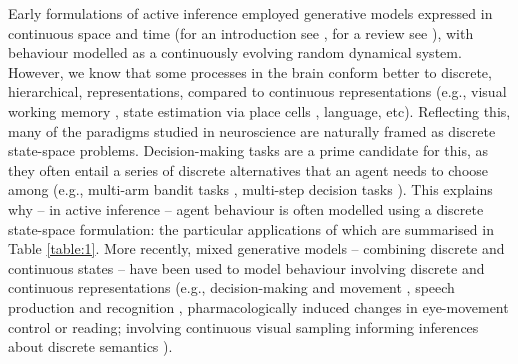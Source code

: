 \documentclass[review,12pt,authoryear]{elsarticle}
\begin{document}
Early formulations of active inference employed generative models expressed in continuous space and time (for an introduction see \citep{bogaczTutorialFreeenergyFramework2017}, for a review see \citep{buckleyFreeEnergyPrinciple2017}), with behaviour modelled as a continuously evolving random dynamical system. However, we know that some processes in the brain conform better to discrete, hierarchical, representations, compared to continuous representations (e.g., visual working memory \citep{luckCapacityVisualWorking1997, zhangDiscreteFixedResolutionRepresentations2008}, state estimation via place cells \citep{eichenbaumHippocampusMemoryPlace1999, okeefeHippocampusSpatialMap1971}, language, etc). Reflecting this, many of the paradigms studied in neuroscience are naturally framed as discrete state-space problems. Decision-making tasks are a prime candidate for this, as they often entail a series of discrete alternatives that an agent needs to choose among (e.g., multi-arm bandit tasks \citep{dawCorticalSubstratesExploratory2006, reverdyModelingHumanDecisionmaking2013, wuGeneralizationGuideshuman2018}, multi-step decision tasks \citep{dawModelBasedInfluencesHumans2011}). This explains why – in active inference – agent behaviour is often modelled using a discrete state-space formulation: the particular applications of which are summarised in Table \ref{table:1}. More recently, mixed generative models \citep{fristonGraphicalBrainBelief2017} – combining discrete and continuous states – have been used to model behaviour involving discrete and continuous representations (e.g., decision-making and movement \citep{parrDiscreteContinuousBrain2018}, speech production and recognition \citep{fristonActiveListening2020}, pharmacologically induced changes in eye-movement control \citep{parrComputationalPharmacologyOculomotion2019} or reading; involving continuous visual sampling informing inferences about discrete semantics \citep{fristonGraphicalBrainBelief2017}).
\end{document}
